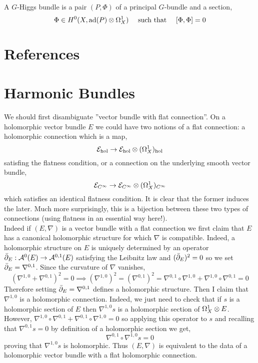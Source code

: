 \documentclass[12pt]{article}
\begin{document}
\begin{defn}
A $G$-Higgs bundle is a pair $(P, \Phi)$ of a principal $G$-bundle and a section,
\[ \Phi \in H^0(X, \mathrm{ad}(P) \otimes \Omega_X^1) \quad \text{ such that } \quad [\Phi, \Phi] = 0 \]
\end{defn}

\section{References}


\section{Harmonic Bundles}

We should first disambiguate ''vector bundle with flat connection''. On a holomorphic vector bundle $E$ we could have two notions of a flat connection: a holomorphic connection which is a map,
\[ \mathcal{E}_{\mathrm{hol}} \to \mathcal{E}_{\mathrm{hol}} \otimes (\Omega^1_X)_{\mathrm{hol}} \]
satisfing the flatness condition,
or a connection on the underlying smooth vector bundle,
\[ \mathcal{E}_{C^{\infty}} \to \mathcal{E}_{C^{\infty}} \otimes (\Omega^1_X)_{C^{\infty}} \]
which satisfies an identical flatness condition. It is clear that the former induces the later. Much more surprisingly, this is a bijection between these two types of connections (using flatness in an essential way here!). 
\bigskip\\
Indeed if $(E, \nabla)$ is a vector bundle with a flat connection we first claim that $E$ has a canonical holomorphic structure for which $\nabla$ is compatible. Indeed, a holomorphic structure on $E$ is uniquely determined by an operator $\bar{\partial}_E : \mathcal{A}^0(E) \to \mathcal{A}^{0,1}(E)$ satisfying the Leibnitz law and $(\bar{\partial}_E)^2 = 0$ so we set $\bar{\partial}_E = \nabla^{0,1}$. Since the curvature of $\nabla$ vanishes,
\[ (\nabla^{1,0} + \nabla^{0,1})^2 = 0 \implies (\nabla^{1,0})^2 = (\nabla^{0,1})^2 = \nabla^{0,1} \circ \nabla^{1,0} + \nabla^{1,0} \circ \nabla^{0,1} = 0 \] 
Therefore setting $\bar{\partial}_E = \nabla^{0,1}$ defines a holomorphic structure. Then I claim that $\nabla^{1,0}$ is a holomorphic connection. Indeed, we just need to check that if $s$ is a holomorphic section of $E$ then $\nabla^{1,0} s$ is a holomorphic section of $\Omega_X^1 \otimes E$. However, $\nabla^{1,0} \circ \nabla^{0,1} + \nabla^{0,1} \circ \nabla^{1,0} = 0$ so applying this operator to $s$ and recalling that $\nabla^{0,1} s = 0$ by definition of a holomorphic section we get,
\[ \nabla^{0,1} \circ \nabla^{1,0} s = 0 \]
proving that $\nabla^{1,0} s$ is holomorphic. Thus $(E, \nabla)$ is equivalent to the data of a holomorphic vector bundle with a flat holomorphic connection.
\end{document}
